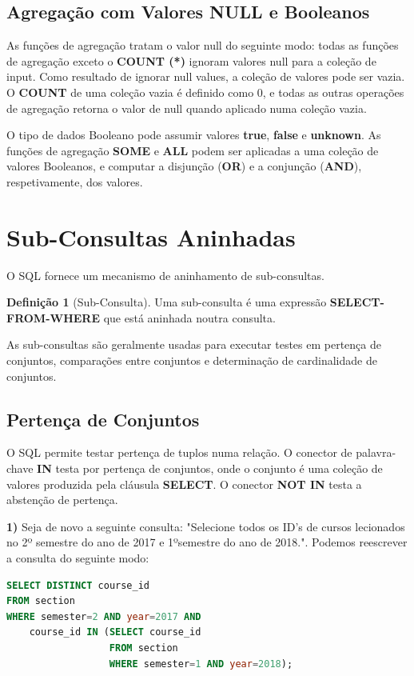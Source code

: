 \documentclass[oneside]{book}
\theoremstyle{definition}
\newtheorem{definition}{Definição}
\begin{document}
\subsection{Agregação com Valores NULL e Booleanos}
As funções de agregação tratam o valor null do seguinte modo: todas as funções de agregação exceto o \textbf{COUNT (*)} ignoram valores null para a coleção de input. Como resultado de ignorar null values, a coleção de valores pode ser vazia. O \textbf{COUNT} de uma coleção vazia é definido como 0, e todas as outras operações de agregação retorna o valor de null quando aplicado numa coleção vazia.

O tipo de dados Booleano pode assumir valores \textbf{true}, \textbf{false} e \textbf{unknown}. As funções de agregação \textbf{SOME} e \textbf{ALL} podem ser aplicadas a uma coleção de valores Booleanos, e computar a disjunção (\textbf{OR}) e a conjunção (\textbf{AND}), respetivamente, dos valores.

\section{Sub-Consultas Aninhadas}
O SQL fornece um mecanismo de aninhamento de sub-consultas.
\begin{definition}[Sub-Consulta]
    Uma sub-consulta é uma expressão \textbf{SELECT-FROM-WHERE} que está aninhada noutra consulta.
\end{definition}
As sub-consultas são geralmente usadas para executar testes em pertença de conjuntos, comparações entre conjuntos e determinação de cardinalidade de conjuntos.

\subsection{Pertença de Conjuntos}
O SQL permite testar pertença de tuplos numa relação. O conector de palavra-chave \textbf{IN} testa por pertença de conjuntos, onde o conjunto é uma coleção de valores produzida pela cláusula \textbf{SELECT}. O conector \textbf{NOT IN} testa a abstenção de pertença.

\textbf{1)} Seja de novo a seguinte consulta: "Selecione todos os ID's de cursos lecionados no 2º semestre do ano de 2017 e 1ºsemestre do ano de 2018.". Podemos reescrever a consulta do seguinte modo:
\begin{lstlisting}[language=SQL, morekeywords={REFERENCES, REFRESH, MATERIALIZED, CONCURRENTLY}, framesep=8pt, xleftmargin=40pt, framexleftmargin=40pt, frame=tb, framerule=0pt]
SELECT DISTINCT course_id
FROM section
WHERE semester=2 AND year=2017 AND
    course_id IN (SELECT course_id
                  FROM section
                  WHERE semester=1 AND year=2018);
\end{lstlisting}
\end{document}

